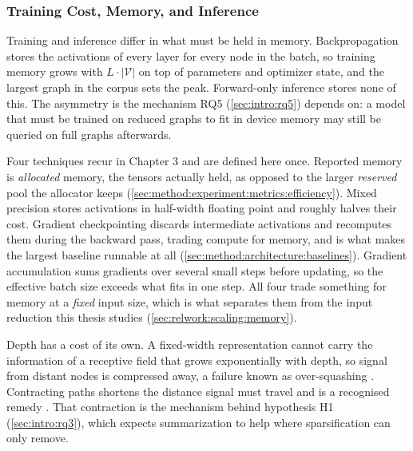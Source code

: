\subsubsection{Training Cost, Memory, and Inference}
\label{sec:prelim:gnn:cost}
Training and inference differ in what must be held in memory. Backpropagation stores the
activations of every layer for every node in the batch, so training memory grows with
$L \cdot |\mathcal{V}|$ on top of parameters and optimizer state, and the largest graph in
the corpus sets the peak. Forward-only inference stores none of this. The asymmetry is
the mechanism RQ5 (\ref{sec:intro:rq5}) depends on: a model that must be trained on
reduced graphs to fit in device memory may still be queried on full graphs afterwards.

Four techniques recur in Chapter 3 and are defined here once. Reported memory is
\emph{allocated} memory, the tensors actually held, as opposed to the larger
\emph{reserved} pool the allocator keeps (\ref{sec:method:experiment:metrics:efficiency}).
Mixed precision stores activations in half-width floating point and roughly halves their
cost. Gradient checkpointing discards intermediate activations and recomputes them during
the backward pass, trading compute for memory, and is what makes the largest baseline
runnable at all (\ref{sec:method:architecture:baselines}). Gradient accumulation sums
gradients over several small steps before updating, so the effective batch size exceeds
what fits in one step. All four trade something for memory at a \emph{fixed} input size,
which is what separates them from the input reduction this thesis studies
(\ref{sec:relwork:scaling:memory}).

Depth has a cost of its own. A fixed-width representation cannot carry the information of
a receptive field that grows exponentially with depth, so signal from distant nodes is
compressed away, a failure known as over-squashing \citep{alon2021oversquashing}.
Contracting paths shortens the distance signal must travel and is a recognised remedy
\citep{dwivedi2022lrgb}. That contraction is the mechanism behind hypothesis H1
(\ref{sec:intro:rq3}), which expects summarization to help where sparsification can only
remove.


